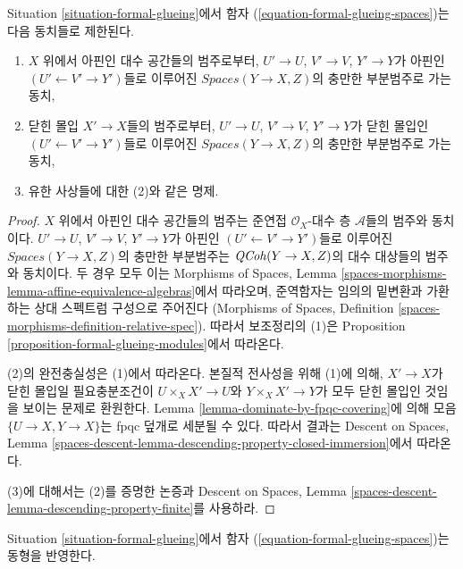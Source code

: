 \begin{lemma}
\label{lemma-equivalence-on-affine}
Situation \ref{situation-formal-glueing}에서 함자
(\ref{equation-formal-glueing-spaces})는 다음 동치들로 제한된다.
\begin{enumerate}
\item $X$ 위에서 아핀인 대수 공간들의 범주로부터,
$U' \to U$, $V' \to V$, $Y' \to Y$가 아핀인
$(U' \leftarrow V' \rightarrow Y')$들로 이루어진
$\textit{Spaces}(Y \to X, Z)$의 충만한 부분범주로 가는 동치,
\item 닫힌 몰입 $X' \to X$들의 범주로부터,
$U' \to U$, $V' \to V$, $Y' \to Y$가 닫힌 몰입인
$(U' \leftarrow V' \rightarrow Y')$들로 이루어진
$\textit{Spaces}(Y \to X, Z)$의 충만한 부분범주로 가는 동치,
\item 유한 사상들에 대한 (2)와 같은 명제.
\end{enumerate}
\end{lemma}

\begin{proof}
$X$ 위에서 아핀인 대수 공간들의 범주는 준연접
$\mathcal{O}_X$-대수 층 $\mathcal{A}$들의 범주와 동치이다.
$U' \to U$, $V' \to V$, $Y' \to Y$가 아핀인
$(U' \leftarrow V' \rightarrow Y')$들로 이루어진
$\textit{Spaces}(Y \to X, Z)$의 충만한 부분범주는
$\mathit{QCoh}(Y \to X, Z)$의 대수 대상들의 범주와 동치이다.
두 경우 모두 이는 Morphisms of Spaces, Lemma
\ref{spaces-morphisms-lemma-affine-equivalence-algebras}에서 따라오며,
준역함자는 임의의 밑변환과 가환하는 상대 스펙트럼 구성으로 주어진다
(Morphisms of Spaces, Definition
\ref{spaces-morphisms-definition-relative-spec}). 따라서 보조정리의 (1)은
Proposition \ref{proposition-formal-glueing-modules}에서 따라온다.

\medskip\noindent
(2)의 완전충실성은 (1)에서 따라온다. 본질적 전사성을 위해 (1)에 의해,
$X' \to X$가 닫힌 몰입일 필요충분조건이
$U \times_X X' \to U$와 $Y \times_X X' \to Y$가 모두 닫힌
몰입인 것임을 보이는 문제로 환원한다. Lemma
\ref{lemma-dominate-by-fpqc-covering}에 의해 모음
$\{U \to X, Y \to X\}$는 fpqc 덮개로 세분될 수 있다. 따라서 결과는
Descent on Spaces, Lemma
\ref{spaces-descent-lemma-descending-property-closed-immersion}에서 따라온다.

\medskip\noindent
(3)에 대해서는 (2)를 증명한 논증과 Descent on Spaces, Lemma
\ref{spaces-descent-lemma-descending-property-finite}를 사용하라.
\end{proof}

\begin{lemma}
\label{lemma-reflects-isomorphisms}
Situation \ref{situation-formal-glueing}에서 함자
(\ref{equation-formal-glueing-spaces})는 동형을 반영한다.
\end{lemma}

